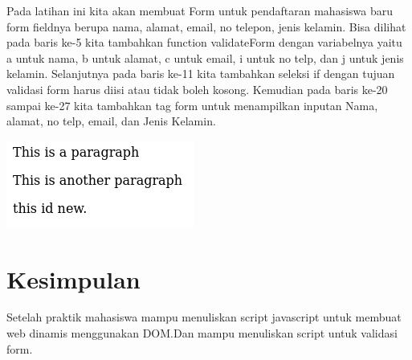 \documentclass[a4paper,12pt]{article}
\begin{document}
Pada latihan ini kita akan membuat Form untuk pendaftaran mahasiswa baru form fieldnya berupa nama, alamat, email, no
telepon, jenis kelamin. Bisa dilihat pada baris ke-5 kita tambahkan function validateForm dengan variabelnya yaitu a
untuk nama, b untuk alamat, c untuk email, i untuk no telp, dan j untuk jenis kelamin. Selanjutnya pada baris ke-11 kita
tambahkan seleksi if dengan tujuan validasi form harus diisi atau tidak boleh kosong. Kemudian pada baris ke-20 sampai
ke-27 kita tambahkan tag form untuk menampilkan inputan Nama, alamat, no telp, email, dan Jenis Kelamin.

\begin{center}
    \includegraphics[scale=.7]{8.png} 
\end{center}

\newpage

\section{Kesimpulan}
Setelah praktik mahasiswa mampu menuliskan script javascript untuk membuat web dinamis menggunakan DOM.\@ Dan mampu menuliskan script untuk validasi form.
\end{document}

